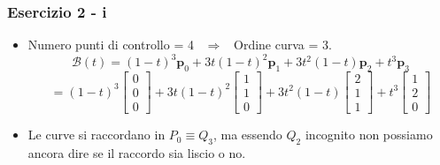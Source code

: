 \documentclass{beamer}
\begin{document}
\begin{frame}
	\frametitle{Esercizio 2 - i}
	\begin{itemize} 
		\item Numero punti di controllo = 4 \ $\Rightarrow$ \ Ordine curva = 3.
		\begin{displaymath}
		\mathcal{B}(t) = (1-t)^3\mathbf{p}_0 + 3 t(1-t)^2\mathbf{p}_1 + 3 t^2(1-t) \mathbf{p}_2+ t^3 \mathbf{p}_3
		\end{displaymath}
		\begin{displaymath}
		= (1 - t)^3 \begin{bmatrix} 0 \\ 0 \\ 0 \end{bmatrix} +
		  3t(1-t)^2 \begin{bmatrix} 1 \\ 1 \\ 0 \end{bmatrix} + 
		  3t^2(1-t) \begin{bmatrix} 2 \\ 1 \\ 1 \end{bmatrix} +
		        t^3 \begin{bmatrix} 1 \\ 2 \\ 0 \end{bmatrix}
		\end{displaymath}

                \vspace{0.5cm}
            \item Le curve si raccordano in $P_0 \equiv Q_3$, ma essendo $Q_2$ incognito non possiamo
        ancora dire se il raccordo sia liscio o no.
	\end{itemize}
\end{frame}
\end{document}
